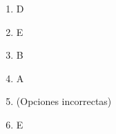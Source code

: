\documentclass[12pt, a4paper]{article}
\newcommand{\respitem}[1]{\item[\textbf{#1.}]} %
\begin{document}
\begin{enumerate}
    \respitem{33} D
    \respitem{34} E %
    \respitem{35} B %
    \respitem{36} A %
    \respitem{36} (Opciones incorrectas)
    \respitem{37} E %

\end{enumerate}
\end{document}
